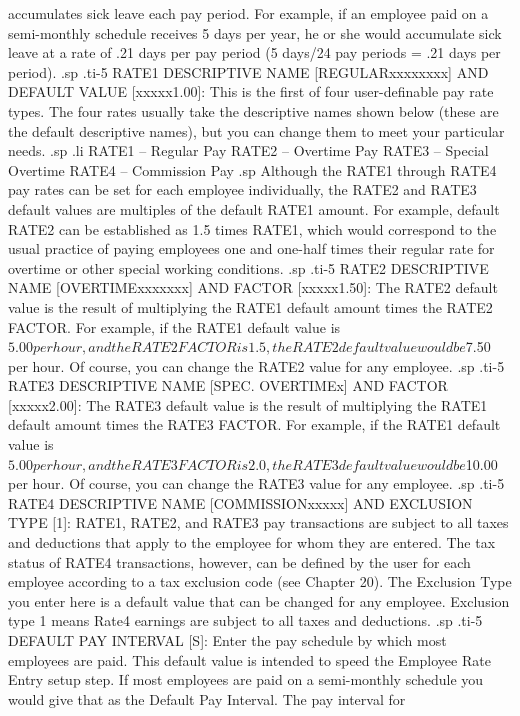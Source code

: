 accumulates sick leave each pay period.  For example, if an employee paid
on a semi-monthly schedule receives 5 days per year, he or she would
accumulate sick leave at a rate of .21 days per pay period (5 days/24
pay periods = .21 days per period).
.sp
.ti-5
RATE1 DESCRIPTIVE NAME [REGULARxxxxxxxx] AND DEFAULT VALUE [xxxxx1.00]:
This is the first of four user-definable pay rate types.  The four rates
usually take the descriptive names shown below (these are the default
descriptive names), but you can change them to meet your particular needs.
.sp
.li
	     RATE1 -- Regular Pay
	     RATE2 -- Overtime Pay
	     RATE3 -- Special Overtime
	     RATE4 -- Commission Pay
.sp
Although the RATE1 through RATE4 pay rates can be set for each employee
individually, the RATE2 and RATE3 default values are multiples of the
default RATE1 amount.  For example, default RATE2 can
be established as 1.5 times
RATE1, which would correspond to the usual practice of paying employees
one and one-half times their regular rate for overtime or other special
working conditions.
.sp
.ti-5
RATE2 DESCRIPTIVE NAME [OVERTIMExxxxxxx] AND FACTOR [xxxxx1.50]: The
RATE2 default value is the result of multiplying the RATE1 default amount
times the RATE2 FACTOR.  For example, if the RATE1 default value is $5.00
per hour, and the RATE2 FACTOR is 1.5, the RATE2 default value would be
$7.50 per hour.  Of course, you can change the RATE2 value for any employee.
.sp
.ti-5
RATE3 DESCRIPTIVE NAME [SPEC. OVERTIMEx] AND FACTOR [xxxxx2.00]: The RATE3
default value is the result of multiplying the RATE1 default amount times
the RATE3 FACTOR.  For example, if the RATE1 default value is $5.00 per hour,
and the RATE3 FACTOR is 2.0, the RATE3 default value would be $10.00
per hour.  Of course, you can change the RATE3 value for any employee.
.sp
.ti-5
RATE4 DESCRIPTIVE NAME [COMMISSIONxxxxx] AND EXCLUSION TYPE [1]: RATE1,
RATE2, and RATE3 pay transactions are subject to all taxes and deductions
that apply to the employee for whom they are entered.  The tax status
of RATE4 transactions, however, can be defined by the user for each employee
according to a
tax exclusion code (see Chapter 20). The Exclusion Type you enter here is
a default value that can be changed for any employee.
Exclusion type 1 means Rate4 earnings
are subject to all taxes and deductions.
.sp
.ti-5
DEFAULT PAY INTERVAL [S]: Enter the pay schedule by which most employees
are paid.  This default value is intended to speed the Employee Rate
Entry setup step.  If most employees are paid on a semi-monthly schedule
you would give that as the Default Pay Interval.  The pay interval for
